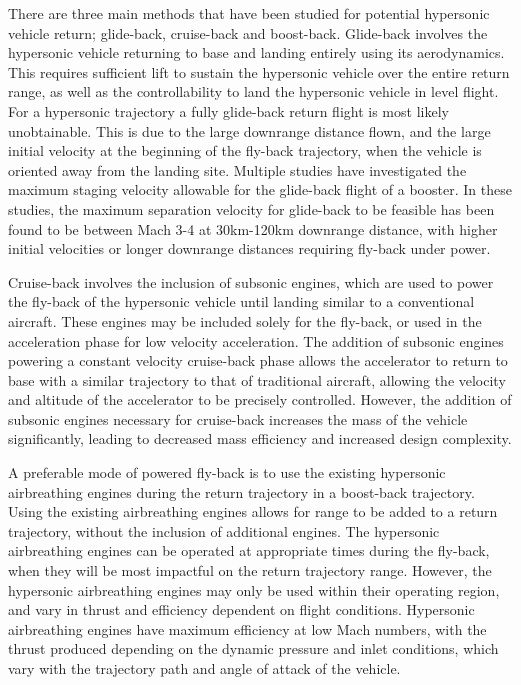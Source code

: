 There are three main methods that have been studied for potential hypersonic vehicle return; glide-back, cruise-back and boost-back. Glide-back involves the hypersonic vehicle returning to base and landing entirely using its aerodynamics. This requires sufficient lift to sustain the hypersonic vehicle over the entire return range, as well as the controllability to land the hypersonic vehicle in level flight. 
For a hypersonic trajectory a fully glide-back return flight is most likely unobtainable. This is due to the large downrange distance flown, and the large initial velocity at the beginning of the fly-back trajectory, when the vehicle is oriented away from the landing site. Multiple studies have investigated the maximum staging velocity allowable for the glide-back flight of a booster. 
In these studies, the maximum separation velocity for glide-back to be feasible has been found to be between Mach 3-4 at 30km-120km downrange distance, with higher initial velocities or longer downrange distances requiring fly-back under power\cite{Hellman,Tetlow1992}.

Cruise-back involves the inclusion of subsonic engines, which are used to power the fly-back of the hypersonic vehicle until landing similar to a conventional aircraft. These engines may be included solely for the fly-back\cite{Hellman}, or used in the acceleration phase for low velocity acceleration\cite{Mehta2001,Tetlow1992,Wilhite1991}. The addition of subsonic engines powering a constant velocity cruise-back phase allows the accelerator to return to base with a similar trajectory to that of traditional aircraft, allowing the velocity and altitude of the accelerator to be precisely controlled. However, the addition of subsonic engines necessary for cruise-back increases the mass of the vehicle significantly, leading to decreased mass efficiency and increased design complexity\cite{Hellman}. 

A preferable mode of powered fly-back is to use the existing hypersonic airbreathing engines during the return trajectory in a boost-back trajectory. Using the existing airbreathing engines allows for range to be added to a return trajectory, without the inclusion of additional engines. The hypersonic airbreathing engines can be operated at appropriate times during the fly-back, when they will be most impactful on the return trajectory range. However, the hypersonic airbreathing engines may only be used within their operating region, and vary in thrust and efficiency dependent on flight conditions. Hypersonic airbreathing engines have maximum efficiency at low Mach numbers\cite{Preller2017b}, with the thrust produced depending on the dynamic pressure and inlet conditions, which vary with the trajectory path and angle of attack of the vehicle. 

